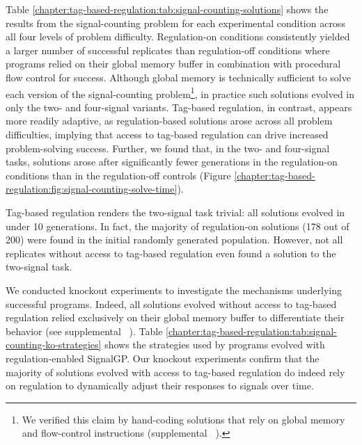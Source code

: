 Table \ref{chapter:tag-based-regulation:tab:signal-counting-solutions} shows the results from the signal-counting problem for each experimental condition across all four levels of problem difficulty. 
Regulation-on conditions consistently yielded a larger number of successful replicates than regulation-off conditions where programs relied on their global memory buffer in combination with procedural flow control for success.
Although global memory is technically sufficient to solve each version of the signal-counting problem\footnote{
We verified this claim by hand-coding solutions that rely on global memory and flow-control instructions (supplemental \supSecHandcodedPrograms\ \citep{tag_regulation_supplement_2021}).
}, 
in practice such solutions evolved in only the two- and four-signal variants.
Tag-based regulation, in contrast, appears more readily adaptive, as regulation-based solutions arose across all problem difficulties, implying that access to tag-based regulation can drive increased problem-solving success.
Further, we found that, in the two- and four-signal tasks, solutions arose after significantly fewer generations in the regulation-on conditions than in the regulation-off controls (Figure \ref{chapter:tag-based-regulation:fig:signal-counting-solve-time}).



Tag-based regulation renders the two-signal task trivial: all solutions evolved in under 10 generations. 
In fact, the majority of regulation-on solutions (178 out of 200) were found in the initial randomly generated population. 
However, not all replicates without access to tag-based regulation even found a solution to the two-signal task.

 

We conducted knockout experiments to investigate the mechanisms underlying successful programs. 
Indeed, all solutions evolved without access to tag-based regulation relied exclusively on their global memory buffer to differentiate their behavior (see supplemental \supSecRepeatedSigAnalysis\ \citep{tag_regulation_supplement_2021}). 
Table \ref{chapter:tag-based-regulation:tab:signal-counting-ko-strategies} shows the strategies used by programs evolved with regulation-enabled SignalGP.
Our knockout experiments confirm that the majority of solutions evolved with access to tag-based regulation do indeed rely on regulation to dynamically adjust their responses to signals over time. 

